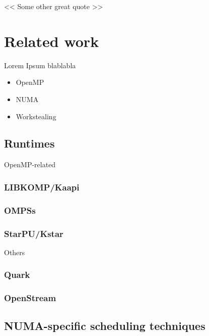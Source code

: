 
\begin{savequote}[6cm]
<< Some other great quote  >>
\end{savequote}
\chapter{Related work}
\chaptertoc

Lorem Ipsum blablabla

\begin{itemize}
  \item OpenMP
  \item NUMA
  \item Workstealing
\end{itemize}

\section{Runtimes}

OpenMP-related

\subsection{LIBKOMP/Kaapi}
\subsection{OMPSs}
\subsection{StarPU/Kstar}

Others

\subsection{Quark}
\subsection{OpenStream}

\section{NUMA-specific scheduling techniques}


